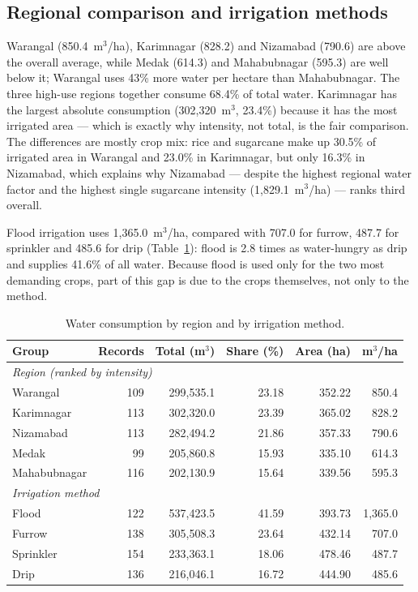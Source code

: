 \documentclass[11pt,a4paper]{article}
\begin{document}
\subsection{Regional comparison and irrigation methods}
Warangal (850.4~m$^3$/ha), Karimnagar (828.2) and Nizamabad (790.6) are above the
overall average, while Medak (614.3) and Mahabubnagar (595.3) are well below it;
Warangal uses 43\% more water per hectare than Mahabubnagar. The three high-use
regions together consume 68.4\% of total water. Karimnagar has the largest absolute
consumption (302,320~m$^3$, 23.4\%) because it has the most irrigated area --- which
is exactly why intensity, not total, is the fair comparison. The differences are
mostly crop mix: rice and sugarcane make up 30.5\% of irrigated area in Warangal and
23.0\% in Karimnagar, but only 16.3\% in Nizamabad, which explains why Nizamabad ---
despite the highest regional water factor and the highest single sugarcane intensity
(1,829.1~m$^3$/ha) --- ranks third overall.

Flood irrigation uses 1,365.0~m$^3$/ha, compared with 707.0 for furrow, 487.7 for
sprinkler and 485.6 for drip (Table~\ref{tab:method}): flood is 2.8 times as
water-hungry as drip and supplies 41.6\% of all water. Because flood is used only for
the two most demanding crops, part of this gap is due to the crops themselves, not
only to the method.

\begin{table}[h]
\centering\small
\caption{Water consumption by region and by irrigation method.}
\label{tab:method}
\begin{tabular}{lrrrrr}
\toprule
Group & Records & Total (m$^3$) & Share (\%) & Area (ha) & m$^3$/ha \\
\midrule
\multicolumn{6}{l}{\textit{Region (ranked by intensity)}} \\
Warangal & 109 & 299,535.1 & 23.18 & 352.22 & 850.4 \\
Karimnagar & 113 & 302,320.0 & 23.39 & 365.02 & 828.2 \\
Nizamabad & 113 & 282,494.2 & 21.86 & 357.33 & 790.6 \\
Medak & 99 & 205,860.8 & 15.93 & 335.10 & 614.3 \\
Mahabubnagar & 116 & 202,130.9 & 15.64 & 339.56 & 595.3 \\
\midrule
\multicolumn{6}{l}{\textit{Irrigation method}} \\
Flood & 122 & 537,423.5 & 41.59 & 393.73 & 1,365.0 \\
Furrow & 138 & 305,508.3 & 23.64 & 432.14 & 707.0 \\
Sprinkler & 154 & 233,363.1 & 18.06 & 478.46 & 487.7 \\
Drip & 136 & 216,046.1 & 16.72 & 444.90 & 485.6 \\
\bottomrule
\end{tabular}
\end{table}
\end{document}
